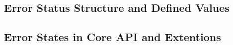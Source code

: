 \documentclass{book}
\begin{document}
\begin{appendices}
\chapter{Error Status Structure and Defined Values}
\label{errstatus} \hypertarget{errstatus}{}
\hypertarget{coreapi_dtde}{}\section{Error States in Core API and
Extentions} \label{coreapi_dtde}

\end{appendices}



\end{document}
